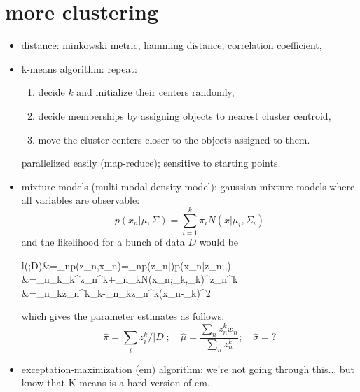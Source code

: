 \documentclass{article}
\begin{document}
\section{more clustering}
\begin{itemize}
	\item distance: minkowski metric, hamming distance, correlation coefficient, 
	\item k-means algorithm: repeat: 
		\begin{enumerate}
			\item decide $k$ and initialize their centers randomly, 
 			\item decide memberships by assigning objects to nearest cluster centroid, 
 			\item move the cluster centers closer to the objects assigned to them. 
		\end{enumerate}
		parallelized easily (map-reduce); sensitive to starting points. 
	\item mixture models (multi-modal density model): gaussian mixture models
		where all variables are observable: 
		\begin{equation}
			p(x_n|\mu,\Sigma)=\sum_{i=1}^k\pi_iN(x|\mu_i,\Sigma_i)
		\end{equation}
		and the likelihood for a bunch of data $D$ would be
		\begin{flalign}
			l(\theta;D)&=\log\prod_np(z_n,x_n)=\log\prod_np(z_n|\pi)p(x_n|z_n;\mu,\sigma)\nonumber \\
				&=\sum_n\log\prod_k\pi_k^{z_n^k}+\sum_n\log\prod_kN(x_n;\mu_k,\sigma_k)^{z_n^k} 
				\nonumber \\
				&=\sum_n\sum_kz_n^k\log\pi_k-\sum_n\sum_kz_n^k(x_n-\mu_k)^2					\end{flalign}
		which gives the parameter estimates as follows: 
		\begin{equation}
			\hat\pi=\sum_i z_i^k/|D|;\quad\hat\mu=\frac{\sum_nz_n^kx_n}{\sum_n z_n^k};\quad
			\hat\sigma=?
		\end{equation}
	\item exceptation-maximization (em) algorithm: we're not going through this...
		but know that K-means is a hard version of em. 
\end{itemize}
\end{document}
